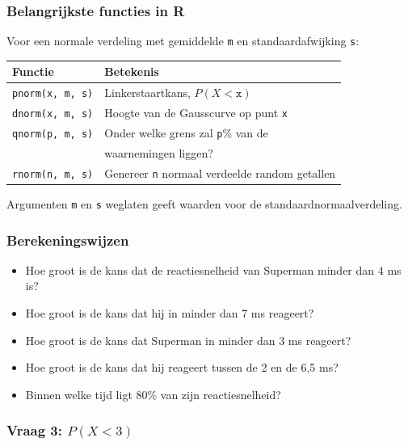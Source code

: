 \documentclass{beamer}
\begin{document}
\begin{frame}[fragile]
  \frametitle{Belangrijkste functies in R}
  
  Voor een normale verdeling met gemiddelde \texttt{m} en standaardafwijking \texttt{s}:
  \vfill
  \centering
  \begin{tabular}{ll}
  	\textbf{Functie}      & \textbf{Betekenis}                          \\ \hline
  	\verb|pnorm(x, m, s)| & Linkerstaartkans, $P(X<\mathtt{x})$         \\
  	\verb|dnorm(x, m, s)| & Hoogte van de Gausscurve op punt \texttt{x} \\
  	\verb|qnorm(p, m, s)| & Onder welke grens zal \texttt{p}\% van de   \\
  	                      & waarnemingen liggen?                        \\
  	\verb|rnorm(n, m, s)| & Genereer \texttt{n} normaal verdeelde random getallen
  \end{tabular}
  \vfill
  Argumenten \texttt{m} en \texttt{s} weglaten geeft waarden voor de standaardnormaalverdeling.
\end{frame}

\begin{frame}
  \frametitle{Berekeningswijzen}

  \begin{itemize}
    \item Hoe groot is de kans dat de reactiesnelheid van Superman minder dan 4 ms is?
    \item Hoe groot is de kans dat hij in minder dan 7 ms reageert?
    \item Hoe groot is de kans dat Superman in minder dan 3 ms reageert?
    \item Hoe groot is de kans dat hij reageert tussen de 2 en de 6,5 ms?
    \item Binnen welke tijd ligt 80\% van zijn reactiesnelheid?
  \end{itemize}
\end{frame}

\begin{frame}
  \frametitle{Vraag 3: $P(X<3)$}

\end{frame}
\end{document}
